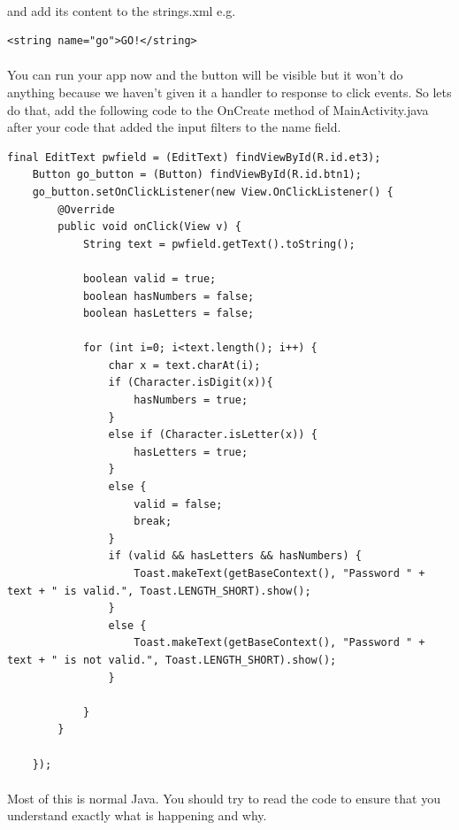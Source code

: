 \paragraph{} and add its content to the strings.xml e.g.

\begin{lstlisting}
<string name="go">GO!</string>
\end{lstlisting}

\paragraph{} You can run your app now and the button will be visible but it won't do anything because we haven't given it a handler to response to click events. So lets do that, add the following code to the OnCreate method of MainActivity.java after your code that added the input filters to the name field.

\begin{lstlisting}
final EditText pwfield = (EditText) findViewById(R.id.et3);
    Button go_button = (Button) findViewById(R.id.btn1);
    go_button.setOnClickListener(new View.OnClickListener() {
        @Override
        public void onClick(View v) {
            String text = pwfield.getText().toString();

            boolean valid = true;
            boolean hasNumbers = false;
            boolean hasLetters = false;

            for (int i=0; i<text.length(); i++) {
                char x = text.charAt(i);
                if (Character.isDigit(x)){
                    hasNumbers = true;
                }
                else if (Character.isLetter(x)) {
                    hasLetters = true;
                }
                else {
                    valid = false;
                    break;
                }
                if (valid && hasLetters && hasNumbers) {
                    Toast.makeText(getBaseContext(), "Password " + text + " is valid.", Toast.LENGTH_SHORT).show();
                }
                else {
                    Toast.makeText(getBaseContext(), "Password " + text + " is not valid.", Toast.LENGTH_SHORT).show();
                }

            }
        }

    });
\end{lstlisting}

\paragraph{} Most of this is normal Java. You should try to read the code to ensure that you understand exactly what is happening and why.

